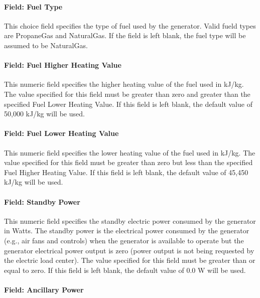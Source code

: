 \paragraph{Field: Fuel Type}\label{field-fuel-type-2}

This choice field specifies the type of fuel used by the generator. Valid fueld types are PropaneGas and NaturalGas. If the field is left blank, the fuel type will be assumed to be NaturalGas.

\paragraph{Field: Fuel Higher Heating Value}\label{field-fuel-higher-heating-value-2}

This numeric field specifies the higher heating value of the fuel used in kJ/kg. The value specified for this field must be greater than zero and greater than the specified Fuel Lower Heating Value. If this field is left blank, the default value of 50,000 kJ/kg will be used.

\paragraph{Field: Fuel Lower Heating Value}\label{field-fuel-lower-heating-value}

This numeric field specifies the lower heating value of the fuel used in kJ/kg. The value specified for this field must be greater than zero but less than the specified Fuel Higher Heating Value. If this field is left blank, the default value of 45,450 kJ/kg will be used.

\paragraph{Field: Standby Power}\label{field-standby-power}

This numeric field specifies the standby electric power consumed by the generator in Watts. The standby power is the electrical power consumed by the generator (e.g., air fans and controls) when the generator is available to operate but the generator electrical power output is zero (power output is not being requested by the electric load center). The value specified for this field must be greater than or equal to zero. If this field is left blank, the default value of 0.0 W will be used.

\paragraph{Field: Ancillary Power}\label{field-ancillary-power}

